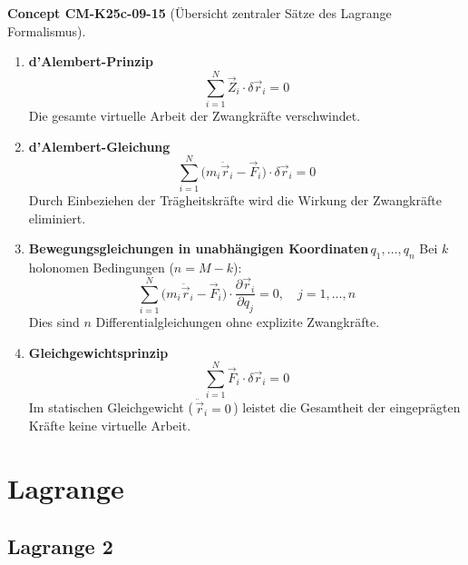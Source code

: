 \documentclass[10pt, letterpaper]{article}
\newcommand{\CustomHeading}[3]{%
  \par\medskip\noindent%
  \textbf{#1 #2} \textnormal{(#3)}.\enskip%
}
\newenvironment{CONC}[2]{\CustomHeading{Concept}{#1}{#2}}{}
\begin{document}
\begin{CONC}{CM-K25c-09-15}{Übersicht zentraler Sätze des Lagrange Formalismus}
\begin{enumerate}
  \item \textbf{d’Alembert-Prinzip}  
        \[
          \boxed{\;
            \sum_{i=1}^{N} \vec Z_i \!\cdot\! \delta\vec r_i = 0
          \;}
        \]
        Die gesamte virtuelle Arbeit der Zwangkräfte verschwindet.

  \item \textbf{d’Alembert-Gleichung}  
        \[
          \boxed{\;
            \sum_{i=1}^{N}
              \bigl(m_i\ddot{\vec r}_i - \vec F_i\bigr)
              \!\cdot\! \delta\vec r_i = 0
          \;}
        \]
        Durch Einbeziehen der Trägheitskräfte wird die Wirkung der
        Zwangkräfte eliminiert.

  \item \textbf{Bewegungsgleichungen in unabhängigen
        Koordinaten\,$q_1,\dots,q_n$}  
        Bei $k$ holonomen Bedingungen ($n=M-k$):
        \[
          \boxed{\;
            \sum_{i=1}^{N}
              \bigl(m_i\ddot{\vec r}_i - \vec F_i\bigr)
              \!\cdot\!
              \frac{\partial\vec r_i}{\partial q_j}
            = 0,
            \quad j=1,\dots,n
          \;}
        \]
        Dies sind $n$ Differentialgleichungen ohne explizite
        Zwangkräfte.

  \item \textbf{Gleichgewichtsprinzip}  
        \[
          \boxed{\;
            \sum_{i=1}^{N} \vec F_i \!\cdot\! \delta\vec r_i = 0
          \;}
        \]
        Im statischen Gleichgewicht (\,${\ddot{\vec r}}_i=0$\,) leistet
        die Gesamtheit der eingeprägten Kräfte keine virtuelle Arbeit.
\end{enumerate}
\end{CONC}

\section{Lagrange}

\subsection{Lagrange 2}
\end{document}
